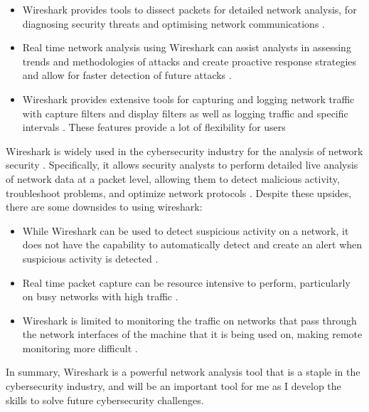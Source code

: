 \documentclass[a4paper, 11pt]{report}
\begin{document}
\begin{itemize}

	\item Wireshark provides tools to dissect packets for detailed network analysis, for diagnosing security threats and optimising network communications \cite{soepeno2023}.

	\item Real time network analysis using Wireshark can assist analysts in assessing trends and methodologies of attacks and create proactive response strategies and allow for faster detection of future attacks \cite{soepeno2023}.

	\item Wireshark provides extensive tools for capturing and logging network traffic with capture filters and display filters as well as logging traffic and specific intervals \cite{banerjee2010}. These features provide a lot of flexibility for users

\end{itemize}

Wireshark is widely used in the cybersecurity industry for the analysis of network security \cite{soepeno2023}. Specifically, it allows security analysts to perform detailed live analysis of network data at a packet level, allowing them to detect malicious activity, troubleshoot problems, and optimize network protocols \cite{banerjee2010}. Despite these upsides, there are some downsides to using wireshark:

\begin{itemize}

	\item While Wireshark can be used to detect suspicious activity on a network, it does not have the capability to automatically detect and create an alert when suspicious activity is detected \cite{mabsali2023}.

	\item Real time packet capture can be resource intensive to perform, particularly on busy networks with high traffic \cite{alizan2024}.

	\item Wireshark is limited to monitoring the traffic on networks that pass through the network interfaces of the machine that it is being used on, making remote monitoring more difficult \cite{alizan2024}.

\end{itemize}

In summary, Wireshark is a powerful network analysis tool that is a staple in the cybersecurity industry, and will be an important tool for me as I develop the skills to solve future cybersecurity challenges.
\end{document}
